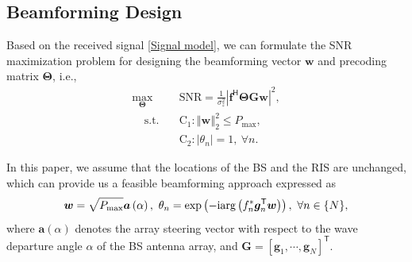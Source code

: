 \documentclass[journal,twocolumn]{IEEEtran}
\theoremstyle{nonumberplain}
\def \T {\bm \Theta}
\def \exp {\text{exp}}
\def \arg {\text{arg}}
\def \T {^{\mathsf{T}}}
\def \H {^{\mathsf{H}}}
\def \ri {{\rm i}}
\begin{document}
        \subsection{Beamforming Design}
        \label{Beamforming design}
        Based on the received signal \eqref{Signal model}, we can formulate the \ac{SNR} maximization problem for designing the beamforming vector $\bm w$ and precoding matrix $\bm \Theta$, i.e.,
        \begin{subequations}
            \label{optimization}
            \begin{align}
            \label{objective}
                \max_{\bm \Theta}~~&\text{SNR}=\frac{1}{\sigma_{z}^{2}}
                \left\vert
                \bm f\H\bm \Theta\bm G\bm w \right\vert^{2},\\
            \label{constraint}
                ~~~~~\text{s.t.~~~}&\text{C}_{1}: \left\Vert \bm w\right \Vert_{2}^{2}\leq P_{\text{max}},\\
                &\text{C}_{2}: \left\vert\theta_{n}\right\vert=1,~\forall n.
            \end{align}
        \end{subequations}
        
    In this paper, we assume that the locations of the \ac{BS} and the RIS are unchanged, which can provide us a feasible beamforming approach expressed as
    \begin{equation}
        \label{traditional beamforming}
        \bm w=\sqrt{P_{\rm max}}\bm a\left(\alpha\right),~ \theta_{n} = \exp\left(-\ri \arg\left(f_{n}^{*}\bm g_{n}\T \bm w\right)\right),~\forall n\in \{N\},
    \end{equation}
    where $\bm a(\alpha)$ denotes the array steering vector with respect to the wave departure angle $\alpha$ of the BS antenna array, and $\bm G = \left[\bm g_{1}, \cdots, \bm g_{N}\right]\T$. 
\end{document}
